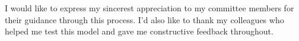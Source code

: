 \begin{acknowledgements}


I would like to express my sincerest appreciation to my committee members for their guidance through this process. I'd also like to thank my colleagues who helped me test this model and gave me constructive feedback throughout. 


\end{acknowledgements}

